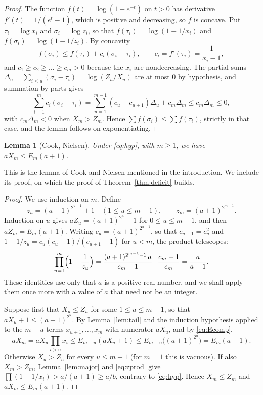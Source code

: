 \documentclass[11pt,reqno]{amsart}
\numberwithin{equation}{section}
\theoremstyle{plain}
\newtheorem{lemma}[theorem]{Lemma}
\theoremstyle{definition}
\theoremstyle{remark}
\begin{document}
\begin{proof}
The function $f(t)=\log(1-e^{-t})$ on $t>0$ has derivative
$f'(t)=1/(e^t-1)$, which is positive and decreasing, so $f$ is
concave. Put $\tau_i=\log x_i$ and $\sigma_i=\log z_i$, so that
$f(\tau_i)=\log(1-1/x_i)$ and $f(\sigma_i)=\log(1-1/z_i)$. By
concavity
\[
  f(\sigma_i)\le f(\tau_i)+c_i(\sigma_i-\tau_i),\qquad
  c_i=f'(\tau_i)=\frac1{x_i-1},
\]
and $c_1\ge c_2\ge\dots\ge c_m>0$ because the $x_i$ are
nondecreasing. The partial sums
$\Delta_u=\sum_{i\le u}(\sigma_i-\tau_i)=\log(Z_u/X_u)$ are at most
$0$ by hypothesis, and summation by parts gives
\[
  \sum_{i=1}^{m}c_i(\sigma_i-\tau_i)
  =\sum_{u=1}^{m-1}(c_u-c_{u+1})\Delta_u+c_m\Delta_m
  \le c_m\Delta_m\le0 ,
\]
with $c_m\Delta_m<0$ when $X_m>Z_m$. Hence
$\sum f(\sigma_i)\le\sum f(\tau_i)$, strictly in that case, and the
lemma follows on exponentiating.
\end{proof}

\begin{lemma}[Cook, Nielsen]\label{lem:cn}
Under \eqref{eq:hyp}, with $m\ge1$, we have $aX_m\le E_m(a+1)$.
\end{lemma}

This is the lemma of Cook \cite{Coo99} and Nielsen \cite{Nie03}
mentioned in the introduction. We include its proof, on which the
proof of Theorem~\ref{thm:deficit} builds.

\begin{proof}
We use induction on $m$. Define
\[
  z_u=(a+1)^{2^{u-1}}+1\quad(1\le u\le m-1),\qquad
  z_m=(a+1)^{2^{m-1}} .
\]
Induction on $u$ gives $aZ_u=(a+1)^{2^u}-1$ for $0\le u\le m-1$, and
then $aZ_m=E_m(a+1)$. Writing $c_u=(a+1)^{2^{u-1}}$, so that
$c_{u+1}=c_u^2$ and $1-1/z_u=c_u(c_u-1)/(c_{u+1}-1)$ for $u<m$, the
product telescopes:
\begin{equation}\label{eq:zprod}
  \prod_{u=1}^{m}\Bigl(1-\frac1{z_u}\Bigr)
  =\frac{(a+1)^{2^{m-1}-1}\,a}{c_m-1}\cdot\frac{c_m-1}{c_m}
  =\frac a{a+1} .
\end{equation}
These identities use only that $a$ is a positive real number, and we
shall apply them once more with a value of $a$ that need not be an
integer.

Suppose first that $X_u\le Z_u$ for some $1\le u\le m-1$, so that
$aX_u+1\le(a+1)^{2^u}$. By Lemma~\ref{lem:tail} and the induction
hypothesis applied to the $m-u$ terms $x_{u+1},\dots,x_m$ with
numerator $aX_u$, and by \eqref{eq:Ecomp},
\[
  aX_m=aX_u\prod_{i>u}x_i\le E_{m-u}(aX_u+1)
  \le E_{m-u}\bigl((a+1)^{2^u}\bigr)=E_m(a+1).
\]
Otherwise $X_u>Z_u$ for every $u\le m-1$ (for $m=1$ this is vacuous).
If also $X_m>Z_m$, Lemma~\ref{lem:major} and \eqref{eq:zprod} give
$\prod(1-1/x_i)>a/(a+1)\ge a/b$, contrary to \eqref{eq:hyp}. Hence
$X_m\le Z_m$ and $aX_m\le E_m(a+1)$.
\end{proof}
\end{document}
